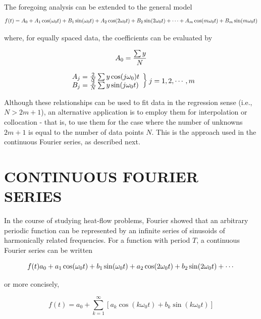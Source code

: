 \documentclass[../main.tex]{subfiles}
\begin{document}
The foregoing analysis can be extended to the general model
\begin{equation}
	\notag
	f(t) = A_0 + A_1 \cos(\omega_0 t) + B_1 \sin(\omega_0 t) + A_2 \cos(2 \omega_0 t) + B_2 \sin(2 \omega_0 t) + \cdots + A_m \cos(m \omega_0 t) + B_m \sin(m \omega_0 t)
\end{equation}

\noindent where, for equally spaced data, the coefficients can be evaluated by

\begin{equation}
	\notag
	A_0 = \frac{\sum y}{N}
\end{equation}

\begin{equation}
	\notag
	\left.
		\begin{array}{ll}
			A_j = \frac{2}{N} \sum y \cos(j \omega_0) t \\
			B_j = \frac{2}{N} \sum y \sin(j \omega_0 t)
		\end{array}
	\right \} j = 1,2, \dotsb , m
\end{equation}

Although these relationships can be used to fit data in the regression sense (i.e.,$N  > 2 m + 1$), an alternative application is to employ them for interpolation or collocation - that
is, to use them for the case where the number of unknowns $2m + 1$ is equal to the number
of data points $N$. This is the approach used in the continuous Fourier series, as described
next.

\label{cha:cha_P_16_2}
\section{CONTINUOUS FOURIER SERIES}

In the course of studying heat-flow problems, Fourier showed that an arbitrary periodic
function can be represented by an infinite series of sinusoids of harmonically related
frequencies. For a function with period $T$, a continuous Fourier series can be written

\begin{equation}
	\notag
	f(t) a_0 + a_1 \cos(\omega_0 t) + b_1 \sin(\omega_0 t) +  a_2 \cos(2 \omega_0 t) + b_2 \sin(2 \omega_0 t) + \cdots
\end{equation}

\noindent or more concisely,

\begin{equation}
	\tag{16.17}
	f(t) = a_0 + \sum ^ \infty _ {k=1} [a_k \cos(k \omega_0 t) + b_k \sin(k \omega_0 t)]
\end{equation}
\end{document}
